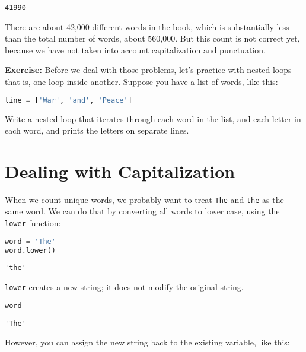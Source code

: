\begin{lstlisting}[style=output]
41990
\end{lstlisting}

There are about 42,000 different words in the book, which is
substantially less than the total number of words, about 560,000. But
this count is not correct yet, because we have not taken into account
capitalization and punctuation.

\textbf{Exercise:} Before we deal with those problems, let's practice
with nested loops -- that is, one loop inside another. Suppose you have
a list of words, like this:

\begin{lstlisting}[language=Python,style=source]
line = ['War', 'and', 'Peace']
\end{lstlisting}

Write a nested loop that iterates through each word in the list, and
each letter in each word, and prints the letters on separate lines.

\section{Dealing with Capitalization}\label{dealing-with-capitalization}

When we count unique words, we probably want to treat
\passthrough{\lstinline!The!} and \passthrough{\lstinline!the!} as the
same word. We can do that by converting all words to lower case, using
the \passthrough{\lstinline!lower!} function:

\begin{lstlisting}[language=Python,style=source]
word = 'The'
word.lower()
\end{lstlisting}

\begin{lstlisting}[style=output]
'the'
\end{lstlisting}

\passthrough{\lstinline!lower!} creates a new string; it does not modify
the original string.

\begin{lstlisting}[language=Python,style=source]
word
\end{lstlisting}

\begin{lstlisting}[style=output]
'The'
\end{lstlisting}

However, you can assign the new string back to the existing variable,
like this:

